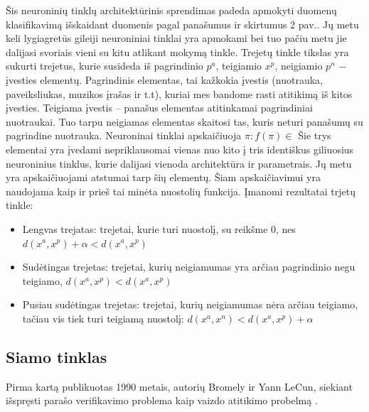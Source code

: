 \documentclass{VUMIFPSkursinis}
\DeclareRobustCommand{\[}{\begin{equation}}
\DeclareRobustCommand{\]}{\end{equation}}
\begin{document}
Šis neuroninių tinklų architektūrinis sprendimas padeda apmokyti duomenų klasifikavimą išskaidant duomenis pagal panašumus ir skirtumus 2 pav.. Jų metu keli lygiagretūs gileiji neuroniniai tinklai yra apmokami bei tuo pačiu metu jie dalijasi svoriais vieni su kitu atlikant mokymą tinkle. Trejetų tinkle tikslas yra sukurti trejetus, kurie susideda iš pagrindinio $p^a$, teigiamio $x^p$, neigiamio $p^n$ − įvesties elementų. Pagrindinis elementas, tai kažkokia įvestis (nuotrauka, paveiksliukas, muzikos įrašas ir t.t), kuriai mes bandome rasti atitikimą iš kitos įvesties. Teigiama įvestis – panašus elementas atitinkamai pagrindiniai nuotraukai. Tuo tarpu neigiamas elementas skaitosi tas, kuris neturi panašumų su pagrindine nuotrauka. Neuroninai tinklai apskaičiuoja  $\pi : f(\pi) \in$
Šie trys elementai yra įvedami nepriklausomai vienas nuo kito į  tris identiškus giliuosius neuroninius tinklus, kurie dalijasi vienoda architektūra ir parametrais. Jų metu yra apskaičiuojami atstumai tarp šių elementų. Šiam apskaičiavimui yra naudojama kaip ir prieš tai minėta nuostolių funkcija.
\newline
Įmanomi rezultatai trjetų tinkle:
\begin{itemize}
\item{Lengvas trejatas: trejetai, kurie turi nuostolį, su reikšme 0, nes $d(x^a, x^p) + \alpha < d(x^a, x^p)$}
\item{Sudėtingas trejetas: trejetai, kurių neigiamumas yra arčiau pagrindinio negu teigiamo, $d(x^a, x^p) < d(x^a, x^p)$}
\item{Pusiau sudėtingas trejetas: trejetai, kurių neigiamumas nėra arčiau teigiamo, tačiau vis tiek turi teigiamą nuostolį: $d(x^a, x^n) < d(x^a, x^p) +\alpha$}
\end{itemize}

\subsection{Siamo tinklas}
Pirma kartą publikuotas 1990 metais, autorių Bromely ir Yann LeCun, siekiant išspręsti parašo verifikavimo problema kaip vaizdo atitikimo probelmą \cite{Siamese_signature_verifiction}.
\end{document}
